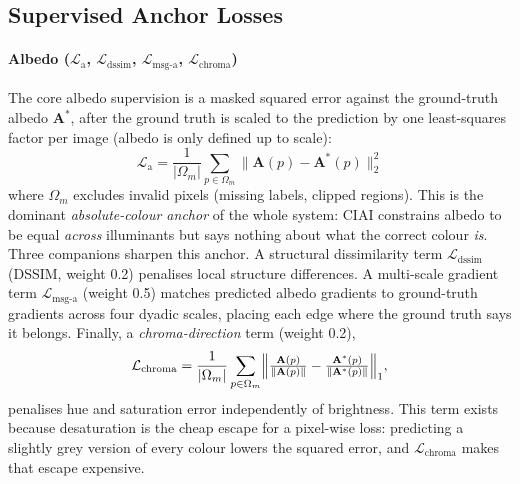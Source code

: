 \subsection{Supervised Anchor Losses}

\paragraph{Albedo ($\mathcal{L}_{\text{a}}$, $\mathcal{L}_{\text{dssim}}$,
$\mathcal{L}_{\text{msg-a}}$, $\mathcal{L}_{\text{chroma}}$)}
The core albedo supervision is a masked squared error against the ground-truth albedo
$\mathbf{A}^*$, after the ground truth is scaled to the prediction by one least-squares
factor per image (albedo is only defined up to scale):
\begin{equation}
  \mathcal{L}_{\text{a}} =
  \frac{1}{|\Omega_m|}\sum_{p \in \Omega_m}
  \bigl\| \mathbf{A}(p) - \mathbf{A}^*(p) \bigr\|_2^2
  \label{eq:l_albedo}
\end{equation}
where $\Omega_m$ excludes invalid pixels (missing labels, clipped regions).
This is the dominant \emph{absolute-colour anchor} of the whole system: CIAI
constrains albedo to be equal \emph{across} illuminants but says nothing about
what the correct colour \emph{is}.
Three companions sharpen this anchor.
A structural dissimilarity term $\mathcal{L}_{\text{dssim}}$ (DSSIM, weight 0.2)
penalises local structure differences.
A multi-scale gradient term $\mathcal{L}_{\text{msg-a}}$ (weight 0.5) matches
predicted albedo gradients to ground-truth gradients across four dyadic scales,
placing each edge where the ground truth says it belongs.
Finally, a \emph{chroma-direction} term (weight 0.2),
\begin{equation}
  \mathcal{L}_{\text{chroma}} =
  \frac{1}{|\Omega_m|}\sum_{p \in \Omega_m}
  \Bigl\| \tfrac{\mathbf{A}(p)}{\|\mathbf{A}(p)\|} -
          \tfrac{\mathbf{A}^*(p)}{\|\mathbf{A}^*(p)\|} \Bigr\|_1 ,
  \label{eq:l_chroma}
\end{equation}
penalises hue and saturation error independently of brightness.
This term exists because desaturation is the cheap escape for a pixel-wise loss:
predicting a slightly grey version of every colour lowers the squared error, and
$\mathcal{L}_{\text{chroma}}$ makes that escape expensive.

